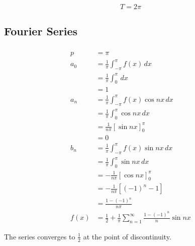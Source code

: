 \documentclass{article}
\begin{document}
\[T = 2 \pi\]

\subsection{Fourier Series}

\subsubsection{}

\begin{align*}
  p    & = \pi                                                                           \\
  a_0  & = \frac{1}{\pi} \int_{-\pi}^\pi f(x) \,d x                                      \\
       & = \frac{1}{\pi} \int_0^\pi \,d x                                                \\
       & = 1                                                                             \\
  a_n  & = \frac{1}{\pi} \int_{-\pi}^\pi f(x) \cos n x \,d x                             \\
       & = \frac{1}{\pi} \int_0^\pi \cos n x \,d x                                       \\
       & = \frac{1}{n \pi} [\sin n x]_0^\pi                                              \\
       & = 0                                                                             \\
  b_n  & = \frac{1}{\pi} \int_{-\pi}^\pi f(x) \sin n x \,d x                             \\
       & = \frac{1}{\pi} \int_0^\pi \sin n x \,d x                                       \\
       & = -\frac{1}{n \pi} [\cos n x]_0^\pi                                             \\
       & = -\frac{1}{n \pi} [(-1)^n - 1]                                                 \\
       & = \frac{1 - (-1)^n}{n \pi}                                                      \\
  f(x) & = \frac{1}{2} + \frac{1}{\pi} \sum_{n = 1}^\infty \frac{1 - (-1)^n}{n} \sin n x
\end{align*}

The series converges to $\frac{1}{2}$ at the point of discontinuity.

\setcounter{subsubsection}{2}
\subsubsection{}
\end{document}
